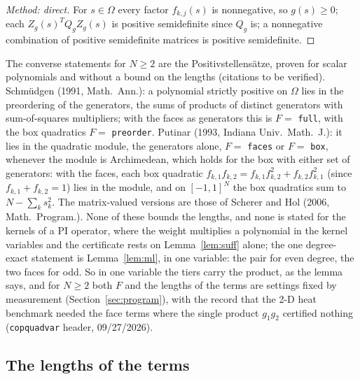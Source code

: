 \documentclass[12pt]{article}
\newcommand{\code}[1]{\texttt{#1}}
\theoremstyle{plain}
\theoremstyle{definition}
\theoremstyle{remark}
\begin{document}
\begin{proof}[Method: direct]
For $s\in\Omega$ every factor $f_{k,j}(s)$ is nonnegative, so $g(s)\ge0$; each $Z_g(s)^TQ_gZ_g(s)$ is positive semidefinite since $Q_g$ is; a nonnegative combination of positive semidefinite matrices is positive semidefinite.
\end{proof}

The converse statements for $N\ge2$ are the Positivstellens\"atze, proven for scalar polynomials and without a bound on the lengths (citations to be verified). Schm\"udgen (1991, Math.\ Ann.): a polynomial strictly positive on $\Omega$ lies in the preordering of the generators, the sums of products of distinct generators with sum-of-squares multipliers; with the faces as generators this is $F=$ \code{full}, with the box quadratics $F=$ \code{preorder}. Putinar (1993, Indiana Univ.\ Math.\ J.): it lies in the quadratic module, the generators alone, $F=$ \code{faces} or $F=$ \code{box}, whenever the module is Archimedean, which holds for the box with either set of generators: with the faces, each box quadratic $f_{k,1}f_{k,2}=f_{k,1}f_{k,2}^2+f_{k,2}f_{k,1}^2$ (since $f_{k,1}+f_{k,2}=1$) lies in the module, and on $[-1,1]^N$ the box quadratics sum to $N-\sum_ks_k^2$. The matrix-valued versions are those of Scherer and Hol (2006, Math.\ Program.). None of these bounds the lengths, and none is stated for the kernels of a PI operator, where the weight multiplies a polynomial in the kernel variables and the certificate rests on Lemma~\ref{lem:suff} alone; the one degree-exact statement is Lemma~\ref{lem:ml}, in one variable: the pair for even degree, the two faces for odd. So in one variable the tiers carry the product, as the lemma says, and for $N\ge2$ both $F$ and the lengths of the terms are settings fixed by measurement (Section~\ref{sec:program}), with the record that the 2-D heat benchmark needed the face terms where the single product $g_1g_2$ certified nothing (\code{copquadvar} header, 09/27/2026).

\subsection{The lengths of the terms}\label{sec:d4}
\end{document}
